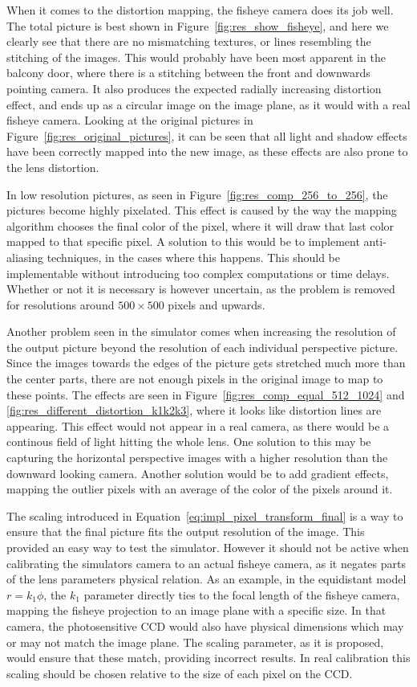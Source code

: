 When it comes to the distortion mapping, the fisheye camera does its job well. The total picture is best shown in Figure~\ref{fig:res_show_fisheye}, and here we clearly see that there are no mismatching textures, or lines resembling the stitching of the images. This would probably have been most apparent in the balcony door, where there is a stitching between the front and downwards pointing camera. It also produces the expected radially increasing distortion effect, and ends up as a circular image on the image plane, as it would with a real fisheye camera. Looking at the original pictures in Figure~\ref{fig:res_original_pictures}, it can be seen that all light and shadow effects have been correctly mapped into the new image, as these effects are also prone to the lens distortion. 

In low resolution pictures, as seen in Figure~\ref{fig:res_comp_256_to_256}, the pictures become highly pixelated. This effect is caused by the way the mapping algorithm chooses the final color of the pixel, where it will draw that last color mapped to that specific pixel. A solution to this would be to implement anti-aliasing techniques, in the cases where this happens. This should be implementable without introducing too complex computations or time delays. Whether or not it is necessary is however uncertain, as the problem is removed for resolutions around $500\times 500$ pixels and upwards.

Another problem seen in the simulator comes when increasing the resolution of the output picture beyond the resolution of each individual perspective picture. Since the images towards the edges of the picture gets stretched much more than the center parts, there are not enough pixels in the original image to map to these points. The effects are seen in Figure~\ref{fig:res_comp_equal_512_1024} and \ref{fig:res_different_distortion_k1k2k3}, where it looks like distortion lines are appearing. This effect would not appear in a real camera, as there would be a continous field of light hitting the whole lens. One solution to this may be capturing the horizontal perspective images with a higher resolution than the downward looking camera. Another solution would be to add gradient effects, mapping the outlier pixels with an average of the color of the pixels around it. 

The scaling introduced in Equation~\eqref{eq:impl_pixel_transform_final} is a way to ensure that the final picture fits the output resolution of the image. This provided an easy way to test the simulator. However it should not be active when calibrating the simulators camera to an actual fisheye camera, as it negates parts of the lens parameters physical relation. As an example, in the equidistant model $r=k_1 \phi$, the $k_1$ parameter directly ties to the focal length of the fisheye camera, mapping the fisheye projection to an image plane with a specific size. In that camera, the photosensitive CCD would also have physical dimensions which may or may not match the image plane. The scaling parameter, as it is proposed, would ensure that these match, providing incorrect results. In real calibration this scaling should be chosen relative to the size of each pixel on the CCD.

